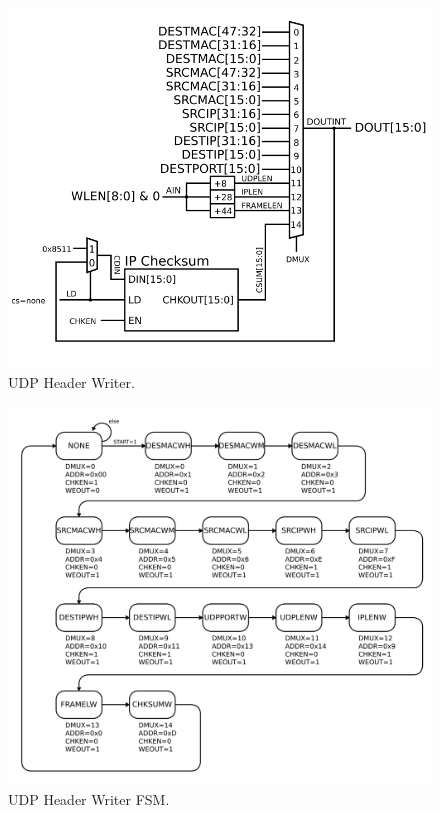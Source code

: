 \begin{figure}
\begin{centering}
\includegraphics[scale=0.8]{udpheaderwriter.svg}
\end{centering}
\caption{UDP Header Writer.}
\label{udpheaderwriter}
\end{figure}

\begin{figure}
\begin{centering}
\includegraphics[scale=0.8]{udpheaderwriter.fsm.svg}
\end{centering}
\caption{UDP Header Writer FSM.}
\label{udpheaderwriter.fsm}
\end{figure}
